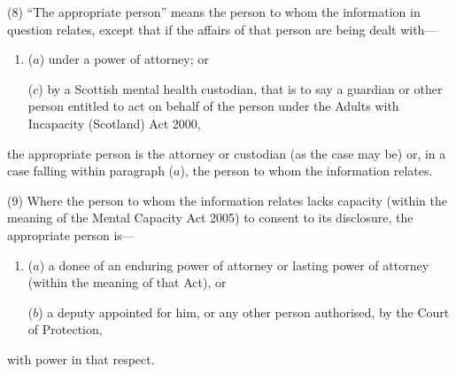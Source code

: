 \documentclass[12pt,a4paper]{article}
\begin{document}
(8) “The appropriate person” means the person to whom the information in question relates, except that if the affairs of that person are being dealt with—
\begin{enumerate}\item[]
($a$) under a power of attorney;
or  %


($c$) by a Scottish mental health custodian, that is to say
%
a guardian or other person entitled to act on behalf of the person under the Adults with Incapacity (Scotland) Act 2000,  %

%
\end{enumerate}
the appropriate person is the attorney
or custodian  %
(as the case may be) or, in a case falling within paragraph ($a$), the person to whom the information relates.

(9) Where the person to whom the information relates lacks capacity (within the meaning of the Mental Capacity Act 2005) to consent to its disclosure, the appropriate person is—
\begin{enumerate}\item[]
($a$) a donee of an enduring power of attorney or lasting power of attorney (within the meaning of that Act), or

($b$) a deputy appointed for him, or any other person authorised, by the Court of Protection,
\end{enumerate}
with power in that respect.
\end{document}
